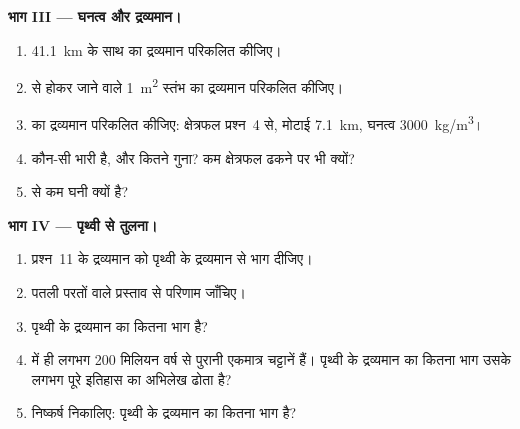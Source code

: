 \begin{problem}[{सप्ताहांत समस्या --- महाद्वीपों का द्रव्यमान}]
\medskip
\noindent\textbf{भाग III --- घनत्व और द्रव्यमान।}
\begin{enumerate}[resume]
  \item \qty{41.1}{km} के साथ  का द्रव्यमान परिकलित कीजिए।
  \item {} से होकर जाने वाले \qty{1}{m^2} स्तंभ का द्रव्यमान
        परिकलित कीजिए।
  \item {} का द्रव्यमान परिकलित कीजिए: क्षेत्रफल प्रश्न~4 से,
        मोटाई \qty{7.1}{km}, घनत्व \qty{3000}{kg/m^3}।
  \item कौन-सी भारी है, और कितने गुना? कम क्षेत्रफल ढकने पर भी
        क्यों?
  \item {}  से कम घनी क्यों है?
\end{enumerate}

\medskip
\noindent\textbf{भाग IV --- पृथ्वी से तुलना।}
\begin{enumerate}[resume]
  \item प्रश्न~11 के द्रव्यमान को पृथ्वी के द्रव्यमान से भाग दीजिए।
  \item पतली परतों वाले प्रस्ताव से परिणाम जाँचिए।
  \item {} पृथ्वी के द्रव्यमान का कितना भाग है?
  \item {} में ही लगभग 200
        मिलियन वर्ष से पुरानी एकमात्र चट्टानें हैं। पृथ्वी के द्रव्यमान का कितना भाग
        उसके लगभग पूरे इतिहास का अभिलेख ढोता है?
  \item निष्कर्ष निकालिए:  पृथ्वी के द्रव्यमान का कितना भाग है?
\end{enumerate}
\end{problem}
